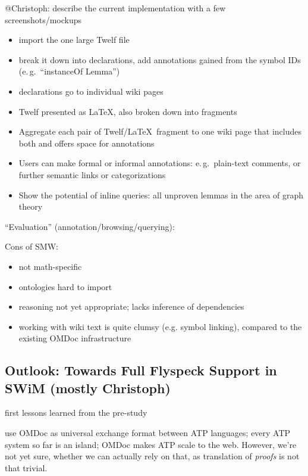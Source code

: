 \documentclass{llncs}
\begin{document}
\begin{todo}{@Christoph: describe the current implementation with a few
    screenshots/mockups}
  \begin{itemize}
  \item import the one large Twelf file
  \item break it down into declarations, add annotations gained from the symbol IDs
    (e.\,g.\ ``instanceOf Lemma'')
  \item declarations go to individual wiki pages
  \item Twelf presented as \LaTeX, also broken down into fragments
  \item Aggregate each pair of Twelf/\LaTeX\ fragment to one wiki page that includes both
    and offers space for annotations
  \item Users can make formal or informal annotations: e.\,g.\ plain-text comments, or
    further semantic links or categorizations
  \item Show the potential of inline queries: all unproven lemmas in the area of graph
    theory
  \end{itemize}
\end{todo}

``Evaluation'' (annotation/browsing/querying):

Cons of SMW:
\begin{itemize}
\item not math-specific
\item ontologies hard to import
\item reasoning not yet appropriate; lacks inference of dependencies
\item working with wiki text is quite clumsy (e.g. symbol linking), compared to the
existing OMDoc infrastructure
\end{itemize}

\subsection{Outlook: Towards Full Flyspeck Support in SWiM (mostly Christoph)}
\label{sec:flyspeck-swim}

first lessons learned from the pre-study

use OMDoc as universal exchange format between ATP languages; every ATP system so far is
an island; OMDoc makes ATP scale to the web.  However, we're not yet sure, whether we can actually rely on that, as translation of \emph{proofs} is not
that trivial.
\end{document}

